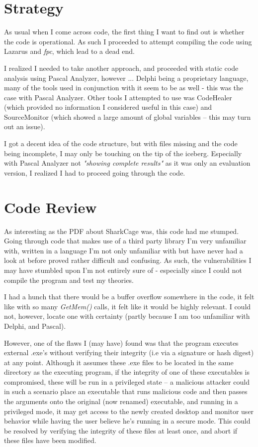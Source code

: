 \section{Strategy}
As usual when I come across code, the first thing I want to find out is whether the code is operational. As such I proceeded to attempt compiling the code using Lazarus and \textit{fpc}, which lead to a dead end. 

I realized I needed to take another approach, and proceeded with static code analysis using Pascal Analyzer, however ... Delphi being a proprietary language, many of the tools used in conjunction with it seem to be as well - this was the case with Pascal Analyzer. Other tools I attempted to use was CodeHealer (which provided no information I considered useful in this case) and SourceMonitor (which showed a large amount of global variables -- this may turn out an issue).

I got a decent idea of the code structure, but with files missing and the code being incomplete, I may only be touching on the tip of the iceberg. Especially with Pascal Analyzer not \textit{"showing complete results"} as it was only an evaluation version, I realized I had to proceed going through the code.

\section{Code Review}
As interesting as the PDF about SharkCage was, this code had me stumped. Going through code that makes use of a third party library I'm very unfamiliar with, written in a language I'm not only unfamiliar with but have never had a look at before proved rather difficult and confusing. As such, the vulnerabilities I may have stumbled upon I'm not entirely sure of - especially since I could not compile the program and test my theories.

I had a hunch that there would be a buffer overflow somewhere in the code, it felt like with so many \textit{GetMem()} calls, it felt like it would be highly relevant. I could not, however, locate one with certainty (partly because I am too unfamiliar with Delphi, and Pascal). 

However, one of the flaws I (may have) found was that the program executes external .exe's without verifying their integrity (i.e via a signature or hash digest) at any point. Although it assumes these .exe files to be located in the same directory as the executing program, if the integrity of one of these executables is compromised, these will be run in a privileged state -- a malicious attacker could in such a scenario place an executable that runs malicious code and then passes the arguments onto the original (now renamed) executable, and running in a privileged mode, it may get access to the newly created desktop and monitor user behavior while having the user believe he's running in a secure mode. This could be resolved by verifying the integrity of these files at least once, and abort if these files have been modified.

